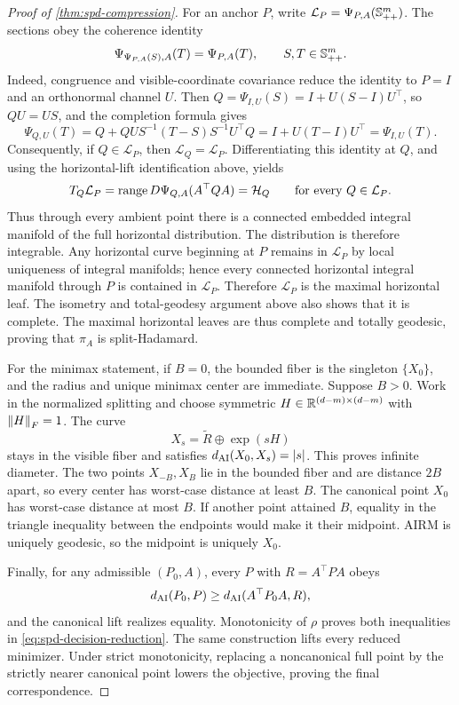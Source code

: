 \begin{proof}[Proof of \cref{thm:spd-compression}]
For an anchor \(P\), write \(\mathcal L_P=\Psi_{P,A}(\mathbb S_{++}^m)\).  The
sections obey the coherence identity
\begin{equation}
  \Psi_{\Psi_{P,A}(S),A}(T)=\Psi_{P,A}(T),
  \qquad S,T\in\mathbb S_{++}^m.
  \label{eq:spd-section-coherence-proof}
\end{equation}
Indeed, congruence and visible-coordinate covariance reduce the identity to
\(P=I\) and an orthonormal channel \(U\).  Then
\(Q=\Psi_{I,U}(S)=I+U(S-I)U^\top\), so \(QU=US\), and the completion formula
gives
\[
  \Psi_{Q,U}(T)
  =Q+QU S^{-1}(T-S)S^{-1}U^\top Q
  =I+U(T-I)U^\top
  =\Psi_{I,U}(T).
\]
Consequently, if \(Q\in\mathcal L_P\), then
\(\mathcal L_Q=\mathcal L_P\).  Differentiating this identity at \(Q\), and
using the horizontal-lift identification above, yields
\[
  T_Q\mathcal L_P
  =\operatorname{range} D\Psi_{Q,A}(A^\top QA)
  =\mathcal H_Q
  \qquad\text{for every }Q\in\mathcal L_P.
\]
Thus through every ambient point there is a connected embedded integral
manifold of the full horizontal distribution.  The distribution is therefore
integrable.  Any horizontal curve beginning at \(P\) remains in
\(\mathcal L_P\) by local uniqueness of integral manifolds; hence every
connected horizontal integral manifold through \(P\) is contained in
\(\mathcal L_P\).  Therefore \(\mathcal L_P\) is the maximal horizontal
leaf.  The isometry and total-geodesy argument above also shows that it is
complete.  The maximal horizontal leaves are thus complete and totally
geodesic, proving that \(\pi_A\) is split-Hadamard.

For the minimax statement, if \(B=0\), the bounded fiber is the singleton
\(\{X_0\}\), and the radius and unique minimax center are immediate.  Suppose
\(B>0\).  Work in the normalized splitting and choose
symmetric \(H\in\mathbb R^{(d-m)\times(d-m)}\) with \(\left\lVert H\right\rVert_F=1\).  The curve
\[
  X_s=\widetilde R\oplus\exp(sH)
\]
stays in the visible fiber and satisfies
\(d_{\mathrm{AI}}(X_0,X_s)=|s|\).  This proves infinite diameter.  The two points
\(X_{-B},X_B\) lie in the bounded fiber and are distance \(2B\) apart, so
every center has worst-case distance at least \(B\).  The canonical point
\(X_0\) has worst-case distance at most \(B\).  If another point attained
\(B\), equality in the triangle inequality between the endpoints would make
it their midpoint.  AIRM is uniquely geodesic, so the midpoint is uniquely
\(X_0\).

Finally, for any admissible \((P_0,A)\), every \(P\) with
\(R=A^\top PA\) obeys
\[
  d_{\mathrm{AI}}(P_0,P)\ge d_{\mathrm{AI}}(A^\top P_0A,R),
\]
and the canonical lift realizes equality.  Monotonicity of \(\rho\) proves
both inequalities in \eqref{eq:spd-decision-reduction}.  The same construction
lifts every reduced minimizer.  Under strict monotonicity, replacing a
noncanonical full point by the strictly nearer canonical point lowers the
objective, proving the final correspondence.
\end{proof}

